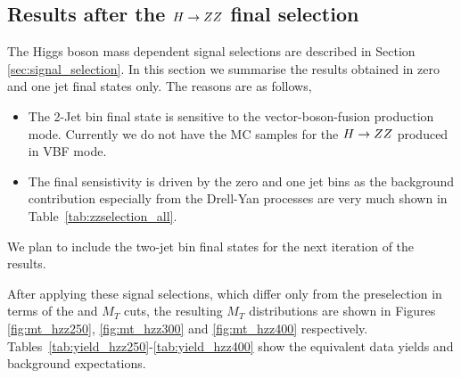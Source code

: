 \subsection{Results after the $H\to ZZ$ final selection}
The Higgs boson mass dependent signal selections are described in Section \ref{sec:signal_selection}. 
In this section we summarise the results obtained in zero and one jet final states only. 
The reasons are as follows,
\begin{itemize}
\item The 2-Jet bin final state is sensitive to the vector-boson-fusion production mode. 
Currently we do not have the MC samples for the $H\to ZZ$ produced in VBF mode.
\item The final sensistivity is driven by the zero and one jet bins as the background contribution especially from the 
Drell-Yan processes are very much shown in Table~\ref{tab:zzselection_all}.
\end{itemize}
We plan to include the two-jet bin final states for the next iteration of the results. 

After applying these signal selections, which differ only from the \zz preselection
in terms of the \met and $M_T$ cuts, the resulting $M_T$ distributions are shown
in Figures \ref{fig:mt_hzz250}, \ref{fig:mt_hzz300} and \ref{fig:mt_hzz400} respectively.
Tables~\ref{tab:yield_hzz250}-\ref{tab:yield_hzz400} show the equivalent data yields
and background expectations.




